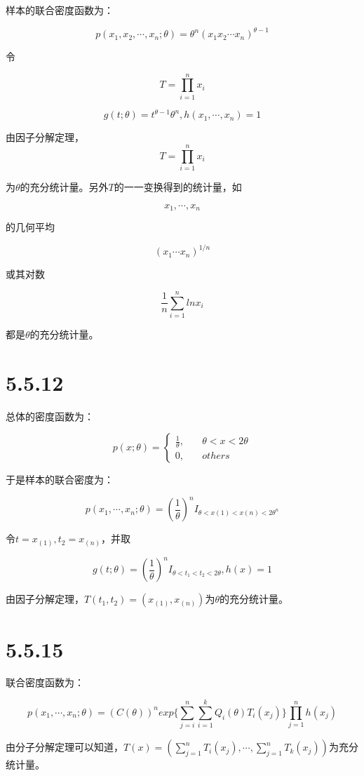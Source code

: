 \documentclass{article}
\begin{document}
样本的联合密度函数为：

$$p(x_1,x_2,\cdots,x_n;\theta)=\theta^n(x_1x_2\cdots x_n)^{\theta-1}$$

令

$$T=\prod^n_{i=1} x_i$$

$$g(t;\theta)=t^{\theta-1}\theta^n, h(x_1,\cdots,x_n)=1$$

由因子分解定理，
$$T=\prod^n_{i=1} x_i$$

为$\theta$的充分统计量。另外$T$的一一变换得到的统计量，如

$$x_1,\cdots,x_n$$

的几何平均

$$(x_1\cdots x_n)^{1/n}$$

或其对数

$$\frac1n\sum^n_{i=1}lnx_i$$

都是$\theta$的充分统计量。

\section{5.5.12}

总体的密度函数为：

\begin{equation}
p(x;\theta)=\left\{
\begin{aligned}
\frac{1}{\theta},&\quad \theta<x<2\theta\\
0,&\quad others
\end{aligned}
\right.
\end{equation}

于是样本的联合密度为：

$$p(x_1,\cdots,x_n;\theta)=(\frac1\theta)^nI_{\theta<x(1)<x(n)<2\theta^n}$$

令$t=x_{(1)},t_2=x_{(n)}$，并取

$$g(t;\theta)=(\frac1\theta)^nI_{\theta<t_1<t_2<2\theta},h(x)=1$$

由因子分解定理，$T(t_1,t_2)=(x_{(1)},x_{(n)})$为$\theta$的充分统计量。

\section{5.5.15}

联合密度函数为：

$$p(x_1,\cdots,x_n;\theta)=(C(\theta))^n exp\{\sum^n_{j=i}\sum^k_{i=1}Q_i(\theta)T_i(x_j)\}\prod^n_{j=1}h(x_j)$$

由分子分解定理可以知道，$T(x)=(\sum^n_{j=1}T_i(x_j),\cdots,\sum^n_{j=1}T_k(x_j))$为充分统计量。
\end{document}

